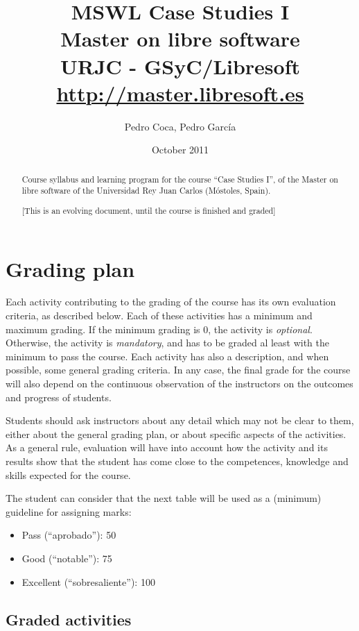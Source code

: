 \documentclass[a4paper]{article}
\title{MSWL Case Studies I \\
Master on libre software \\
URJC - GSyC/Libresoft \\
\url{http://master.libresoft.es}}
\author{Pedro Coca, Pedro García}
\date{October 2011}
\begin{document}
\maketitle

\begin{abstract}
Course syllabus and learning program for the course ``Case Studies I'', 
of the Master on libre software of the Universidad Rey Juan Carlos (Móstoles, Spain).

[This is an evolving document, until the course is finished and graded]
\end{abstract}

\tableofcontents

\section{Grading plan}

Each activity contributing to the grading of the course has its own evaluation criteria, 
as described below. Each of these activities has a minimum and maximum grading. If the 
minimum grading is 0, the activity is \textit{optional}. Otherwise, the activity is \textit{mandatory}, and 
has to be graded al least with the minimum to pass the course. Each activity has also a 
description, and when possible, some general grading criteria. In any case, the final grade 
for the course will also depend on the continuous observation of the instructors on the 
outcomes and progress of students.

Students should ask instructors about any detail which may not be clear to them, 
either about the general grading plan, or about specific aspects of the activities. 
As a general rule, evaluation will have into account how the activity and its results 
show that the student has come close to the competences, knowledge and skills expected 
for the course.

The student can consider that the next table will be used as a (minimum) guideline for 
assigning marks:

\begin{itemize}
\item Pass (``aprobado''): 50
\item Good (``notable''): 75
\item Excellent (``sobresaliente''): 100
\end{itemize}

\subsection{Graded activities}
\end{document}
